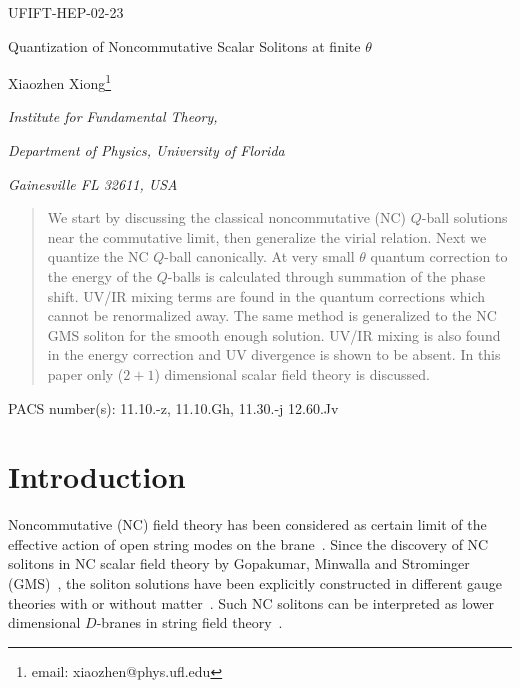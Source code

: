 \documentclass[a4paper,a4paper]{article}
\begin{document}
\begin{flushright}    
UFIFT-HEP-02-23 
\end{flushright}
\vskip 1cm

\centerline{\Large Quantization of Noncommutative Scalar Solitons at finite $\theta$}
\vskip 1cm
\centerline{Xiaozhen Xiong\footnote{email: xiaozhen@phys.ufl.edu}}
\date{}
\vskip 0.5cm
\centerline{\it Institute for Fundamental Theory,}
\centerline{\it Department of Physics, University of Florida}
\centerline{\it Gainesville FL 32611, USA}
\vskip 1cm
\begin{abstract}
We start by discussing the classical noncommutative (NC) $Q$-ball solutions 
near the commutative limit, then generalize the virial relation. 
Next we quantize the NC $Q$-ball canonically. At very small $\theta$ 
quantum correction to the energy of the $Q$-balls is calculated through 
summation of the phase shift. UV/IR mixing terms are found in the 
quantum corrections which cannot be renormalized away. The same method 
is generalized to the NC GMS soliton for the smooth enough solution. 
UV/IR mixing is also found in the energy correction and UV divergence 
is shown to be absent. In this paper only ($2+1$) dimensional scalar field 
theory is discussed. 
\end{abstract}
\vskip 1cm
\noindent PACS number(s): 11.10.-z, 11.10.Gh, 11.30.-j 12.60.Jv
\vskip 1cm
\vskip 1cm

\section{Introduction}

Noncommutative (NC) field theory has been considered as certain limit of 
the effective action of open string modes on the brane~\cite{SW,Connes}. 
Since the discovery of NC solitons in NC scalar field theory 
by Gopakumar, Minwalla and Strominger (GMS)~\cite{GMS}, 
the soliton solutions have been explicitly
constructed in different gauge theories with or without matter~\cite{Nek,Komba}.  
Such NC solitons can be interpreted as lower dimensional $D$-branes in
string field theory~\cite{MinUnstable,HarveyDbrane}. 
\end{document}
